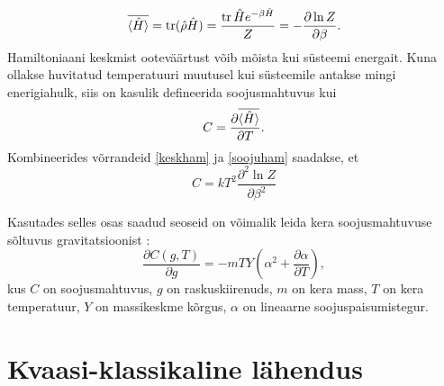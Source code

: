 \documentclass{trkut}%
\DeclareMathOperator{\tr}{tr}
\renewcommand\braket[1]{\langle{#1}\rangle}
\begin{document}
\begin{equation}
    \overline{\braket{\op{H}}}=\tr(\op{\rho}\op{H})=\frac{\tr{\op{H}e^{-\beta \op{H}}}}{Z}= -\frac{\partial \ln Z}{\partial \beta}.
    \label{keskham}
\end{equation}
Hamiltoniaani keskmist ooteväärtust võib mõista kui süsteemi energait. Kuna ollakse huvitatud temperatuuri muutusel kui süsteemile antakse mingi enerigiahulk, siis on kasulik defineerida soojusmahtuvus kui
\begin{equation}
    C = \frac{\partial \overline{\braket{\op{H}}}}{\partial T}.
    \label{soojuham}
\end{equation}
Kombineerides võrrandeid \eqref{keskham} ja \eqref{soojuham} saadakse, et
\begin{equation}
    C = k T^2 \frac{\partial^2 \ln Z}{\partial \beta^2}
    \label{mahtuvus}
\end{equation}

Kasutades selles osas saadud seoseid on võimalik leida kera soojusmahtuvuse sõltuvus gravitatsioonist \parencite[10-13]{palma15}:
\begin{equation}
    \frac{\partial C(g,T)}{\partial g} = -mTY \left( \alpha^2 + \frac{\partial \alpha}{\partial T} \right),
\end{equation}
kus \(C\) on soojusmahtuvus, \(g\) on raskuskiirenuds, \(m\) on kera mass, \(T\) on kera temperatuur, \(Y\) on massikeskme kõrgus, \(\alpha\) on lineaarne soojuspaisumistegur.


\section{Kvaasi-klassikaline lähendus}
\end{document}
